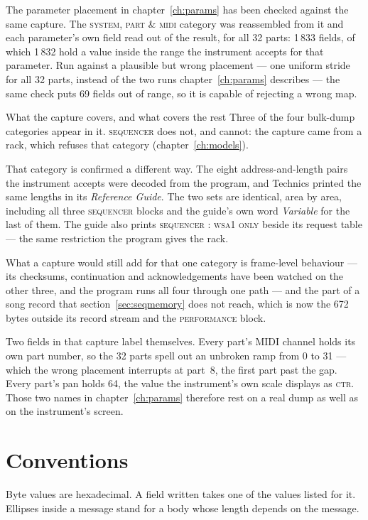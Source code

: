 The parameter placement in chapter~\ref{ch:params} has been checked against the same
capture. The \textsc{system, part \& midi} category was reassembled from it and each
parameter's own field read out of the result, for all 32 parts: 1\,833 fields, of which
1\,832 hold a value inside the range the instrument accepts for that parameter. Run
against a plausible but wrong placement --- one uniform stride for all 32 parts, instead of
the two runs chapter~\ref{ch:params} describes --- the same check puts 69 fields out of
range, so it is capable of rejecting a wrong map.

\begin{note}{What the capture covers, and what covers the rest}
Three of the four bulk-dump categories appear in it. \textsc{sequencer} does not, and
cannot: the capture came from a rack, which refuses that category
(chapter~\ref{ch:models}).

That category is confirmed a different way. The eight address-and-length pairs the
instrument accepts were decoded from the program, and Technics printed the same lengths
in its \emph{Reference Guide}. The two sets are identical, area by area, including all
three \textsc{sequencer} blocks and the guide's own word \emph{Variable} for the last of
them. The guide also prints \textsc{sequencer : wsa1 only} beside its request table ---
the same restriction the program gives the rack.

What a capture would still add for that one category is frame-level behaviour --- its
checksums, continuation and acknowledgements have been watched on the other three, and the
program runs all four through one path --- and the part of a song record that
section~\ref{sec:seqmemory} does not reach, which is now the 672 bytes outside its record
stream and the \textsc{performance} block.
\end{note}

Two fields in that capture label themselves. Every part's MIDI channel holds its own part
number, so the 32 parts spell out an unbroken ramp from 0 to 31 --- which the wrong
placement interrupts at part~8, the first part past the gap. Every part's pan holds 64,
the value the instrument's own scale displays as \textsc{ctr}. Those two names in
chapter~\ref{ch:params} therefore rest on a real dump as well as on the instrument's
screen.

\section{Conventions}
Byte values are hexadecimal. A field written  takes one of the values
listed for it. Ellipses inside a message stand for a body whose length depends on the
message.

